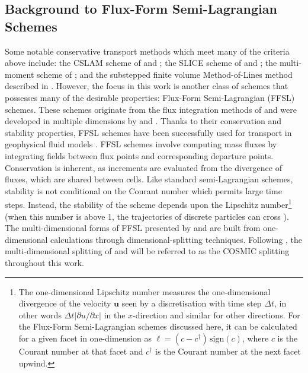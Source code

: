 \documentclass[11pt,a4paper]{article}
\begin{document}
\subsection{Background to Flux-Form Semi-Lagrangian Schemes}
Some notable conservative transport methods which meet many of the criteria above include: the CSLAM scheme of \citet{lauritzen2010conservative} and \citet{harris2011flux}; the SLICE scheme of \citet{zerroukat2002slice,zerroukat2004slice} and \citet{zerroukat2012three}; the multi-moment scheme of \cite{tang2022three}; and the substepped finite volume Method-of-Lines method described in \citet{melvin2024mixed}.
However, the focus in this work is another class of schemes that possesses many of the desirable properties: Flux-Form Semi-Lagrangian (FFSL) schemes.
These schemes originate from the flux integration methods of \citet{van1974towards,colella1984ppm,carpenter1990application}
and were developed in multiple dimensions by \citet{leonard1996cosmic} and \citet{lin1996ffsl}.
Thanks to their conservation and stability properties, FFSL schemes have been successfully used for transport in geophysical fluid models \citep{lin2004fvcore,putman2007fvtransport,zhou2012computational,neale2013mean,gillibrand2016mass,harris2021scientific,zhang2023history,mouallem2023implementation}.
FFSL schemes involve computing mass fluxes by integrating fields between flux points and corresponding departure points.
Conservation is inherent, as increments are evaluated from the divergence of fluxes, which are shared between cells.
Like standard semi-Lagrangian schemes, stability is not conditional on the Courant number which permits large time steps.
Instead, the stability of the scheme depends upon the Lipschitz number\footnote{The one-dimensional Lipschitz number measures the one-dimensional divergence of the velocity $\bm{u}$ seen by a discretisation with time step $\Delta t$, in other words $\Delta t|\partial u /\partial x|$ in the $x$-direction and similar for other directions. For the Flux-Form Semi-Lagrangian schemes discussed here, it can be calculated for a given facet in one-dimension as $\ell=(c-c^\dagger) \, \mathrm{sign}(c)$, where $c$ is the Courant number at that facet and $c^\dagger$ is the Courant number at the next facet upwind.} (when this number is above 1, the trajectories of discrete particles can cross \citep{smolarkiewicz1992class}).
The multi-dimensional forms of FFSL presented by \citet{leonard1996cosmic} and \citet{lin1996ffsl} are built from one-dimensional calculations through dimensional-splitting techniques.
Following \citet{leonard1996cosmic}, the multi-dimensional splitting of \citet{leonard1996cosmic} and \citet{lin1996ffsl} will be referred to as the COSMIC splitting throughout this work.
\end{document}
